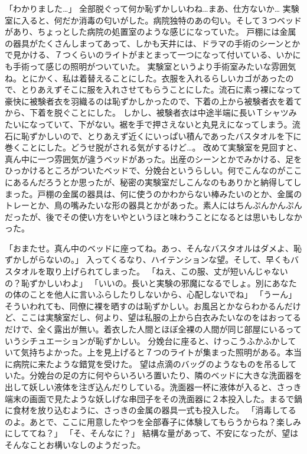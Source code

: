 「わかりました…」
全部脱ぐって何か恥ずかしいわね…まあ、仕方ないか…
実験室に入ると、何だか消毒の匂いがした。病院独特のあの匂い。そして３つベッドがあり、ちょっとした病院の処置室のような感じになっていた。
戸棚には金属の器具がたくさんしまってあって、しかも天井には、ドラマの手術のシーンとかで見かける、７つくらいのライトがまとまって一つになって付いている、いかにも手術って感じの照明がついていた。
実験室というより手術室みたいな雰囲気ね。とにかく、私は着替えることにした。衣服を入れるらしいカゴがあったので、とりあえずそこに服を入れさせてもらうことにした。流石に素っ裸になって豪快に被験者衣を羽織るのは恥ずかしかったので、下着の上から被験者衣を着てから、下着を脱ぐことにした。
しかし、被験者衣は中途半端に長いＴシャツみたいになっていて、下がない。裾を手で押さえないと丸見えになってしまう。流石に恥ずかしいので、とりあえず近くにいっぱい積んであったバスタオルを下に巻くことにした。どうせ脱がされる気がするけど…。
改めて実験室を見回すと、真ん中に一つ雰囲気が違うベッドがあった。出産のシーンとかでみかける、足をひっかけるところがついたベッドで、分娩台というらしい。何でこんなのがここにあるんだろうとか思ったが、秘密の実験室だしこんなのもありかと納得してしまった。戸棚の金属の器具は、何に使うのかわからない棒みたいのとか、金属のトレーとか、鳥の嘴みたいな形の器具とかがあった。素人にはちんぷんかんぷんだったが、後でその使い方をいやというほと味わうことになるとは思いもしなかった。

「おまたせ。真ん中のベッドに座ってね。あっ、そんなバスタオルはダメよ、恥ずかしがらないの。」
入ってくるなり、ハイテンションな望。そして、早くもバスタオルを取り上げられてしまった。
「ねえ、この服、丈が短いんじゃないの？恥ずかしいわよ」
「いいの。長いと実験の邪魔になるでしょ。別にあなたの体のことを他人に言いふらしたりしないから、心配しないでね」
「うーん」
そういわれても、同僚に裸を晒すのは恥ずかしい。お風呂とかならわかるんだけど、ここは実験室だし、何より、望は私服の上から白衣みたいなのをはおってるだけで、全く露出が無い。着衣した人間とほぼ全裸の人間が同じ部屋にいるっていうシチュエーションが恥ずかしい。
分娩台に座ると、けっこうふかふかしていて気持ちよかった。上を見上げると７つのライトが集まった照明がある。本当に病院に来たような錯覚を受けた。
望は点滴のバッグのようなものを吊るしていた。分娩台の足の方に何やらいろいろ置いたり、隣のベッドに大きな洗面器を出して妖しい液体を注ぎ込んだりしている。洗面器一杯に液体が入ると、さっき端末の画面で見たような妖しげな串団子をその洗面器に２本投入した。まるで鍋に食材を放り込むように、さっきの金属の器具一式も投入した。
「消毒してるのよ。あとで、ここに用意したやつを全部春子に体験してもらうからね？楽しみにしててね？」
「そ、そんなに？」
結構な量があって、不安になったが、望はそんなことお構いなしのようだった。

